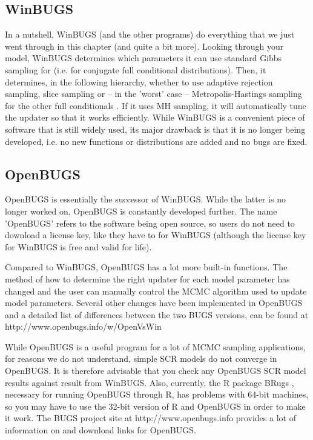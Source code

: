 \subsection{WinBUGS}
In a nutshell, WinBUGS (and the other programs) do everything that we just went through in this chapter (and quite a bit more). Looking through your model, WinBUGS determines which parameters it can use standard Gibbs sampling for (i.e. for conjugate full conditional distributions). Then, it determines, in the following hierarchy, whether to use adaptive rejection sampling, slice sampling or -- in the 'worst' case -- Metropolis-Hastings sampling for the other full conditionals \citep{spiegelhalter_etal:2003}. If it uses MH sampling, it will automatically tune the updater so that it works efficiently.
While WinBUGS is a convenient piece of software that is still widely used, its major drawback is that it is no longer being developed, i.e. no new functions or distributions are added and no bugs are fixed.

\subsection{OpenBUGS}
OpenBUGS is essentially the successor of WinBUGS. While the latter is
no longer worked on, OpenBUGS is constantly developed further. The
name 'OpenBUGS' refers to the software being open source, so users do
not need to download a license key, like they have to for WinBUGS
(although the license key for WinBUGS is free and valid for life).

Compared to WinBUGS, OpenBUGS has a lot more built-in functions. The
method of how to determine the right updater for each model parameter
has changed and the user can manually control the MCMC algorithm used
to update model parameters.  Several other changes have been
implemented in OpenBUGS and a detailed list of differences between the
two BUGS versions, can be found at
http://www.openbugs.info/w/OpenVsWin

While OpenBUGS is a useful program for a lot of MCMC sampling
applications, for reasons we do not understand, simple SCR models do
not converge in OpenBUGS. It is therefore advisable that you check any
OpenBUGS SCR model results against result from WinBUGS. Also,
currently, the R package BRugs \citep{thomas_etal:2006}, necessary
for running OpenBUGS through R, has problems with 64-bit machines, so
you may have to use the 32-bit version of R and OpenBUGS in order to
make it work. The BUGS project site at http://www.openbugs.info
provides a lot of information on and download links for OpenBUGS.

